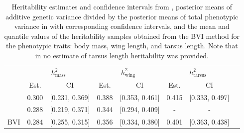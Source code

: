 \begin{table}[H]
  \centering
  \small
  \begin{tabular}{lccccccc}
    \toprule
    & \multicolumn{2}{c}{$h^2_{\text{mass}}$} & \multicolumn{2}{c}{$h^2_{\text{wing}}$} & \multicolumn{2}{c}{$h^2_{\text{tarsus}}$} \\
    \cmidrule(lr){2-3} \cmidrule(lr){4-5} \cmidrule(lr){6-7}
    & Est. & CI & Est. & CI & Est. & CI \\
    \midrule
    \citet{Silva2017} & 0.300 & [0.231, 0.369] & 0.388 & [0.353, 0.461] & 0.415 & [0.333, 0.497] \\
    \citet{Muff2019Genetic} & 0.288 & [0.219, 0.371] & 0.344 & [0.294, 0.409] & - & - \\
    BVI & 0.284 & [0.255, 0.315] & 0.356 & [0.334, 0.380] & 0.401 & [0.363, 0.438] \\
    \bottomrule
  \end{tabular}
  \caption[Heritability estimates and confidence intervals]{Heritability estimates and confidence intervals from \citet{Silva2017}, posterior means of additive genetic variance divided by the posterior means of total phenotypic variance in \citet{Muff2019Genetic} with corresponding confidence intervals, and the mean and quantile values of the heritability samples obtained from the BVI method for the phenotypic traits: body mass, wing length, and tarsus length. Note that in \citet{Muff2019Genetic} no estimate of tarsus length heritability was provided.}
  \label{table:summary_heritability}
\end{table}
